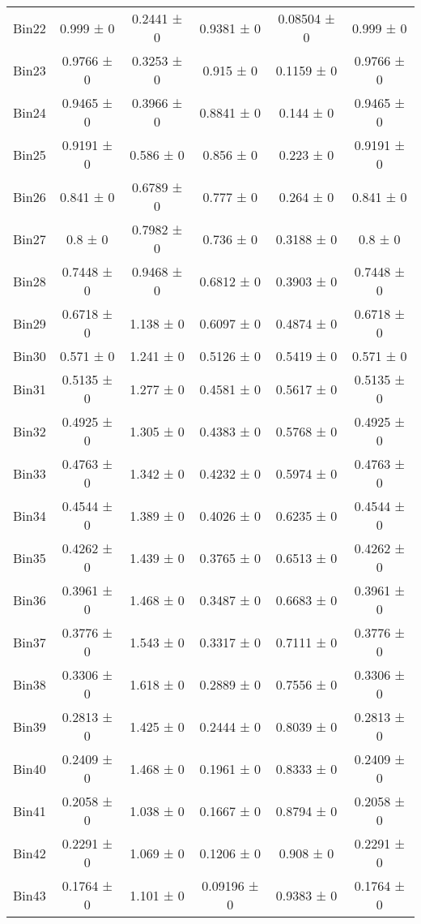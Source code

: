\begin{tabular}{@{\extracolsep{4pt}}lccccc@{}}
     Bin22 & 0.999 ± 0 & 0.2441 ± 0 & 0.9381 ± 0 & 0.08504 ± 0 & 0.999 ± 0 \\ 
     Bin23 & 0.9766 ± 0 & 0.3253 ± 0 & 0.915 ± 0 & 0.1159 ± 0 & 0.9766 ± 0 \\ 
     Bin24 & 0.9465 ± 0 & 0.3966 ± 0 & 0.8841 ± 0 & 0.144 ± 0 & 0.9465 ± 0 \\ 
     Bin25 & 0.9191 ± 0 & 0.586 ± 0 & 0.856 ± 0 & 0.223 ± 0 & 0.9191 ± 0 \\ 
     Bin26 & 0.841 ± 0 & 0.6789 ± 0 & 0.777 ± 0 & 0.264 ± 0 & 0.841 ± 0 \\ 
     Bin27 & 0.8 ± 0 & 0.7982 ± 0 & 0.736 ± 0 & 0.3188 ± 0 & 0.8 ± 0 \\ 
     Bin28 & 0.7448 ± 0 & 0.9468 ± 0 & 0.6812 ± 0 & 0.3903 ± 0 & 0.7448 ± 0 \\ 
     Bin29 & 0.6718 ± 0 & 1.138 ± 0 & 0.6097 ± 0 & 0.4874 ± 0 & 0.6718 ± 0 \\ 
     Bin30 & 0.571 ± 0 & 1.241 ± 0 & 0.5126 ± 0 & 0.5419 ± 0 & 0.571 ± 0 \\ 
     Bin31 & 0.5135 ± 0 & 1.277 ± 0 & 0.4581 ± 0 & 0.5617 ± 0 & 0.5135 ± 0 \\ 
     Bin32 & 0.4925 ± 0 & 1.305 ± 0 & 0.4383 ± 0 & 0.5768 ± 0 & 0.4925 ± 0 \\ 
     Bin33 & 0.4763 ± 0 & 1.342 ± 0 & 0.4232 ± 0 & 0.5974 ± 0 & 0.4763 ± 0 \\ 
     Bin34 & 0.4544 ± 0 & 1.389 ± 0 & 0.4026 ± 0 & 0.6235 ± 0 & 0.4544 ± 0 \\ 
     Bin35 & 0.4262 ± 0 & 1.439 ± 0 & 0.3765 ± 0 & 0.6513 ± 0 & 0.4262 ± 0 \\ 
     Bin36 & 0.3961 ± 0 & 1.468 ± 0 & 0.3487 ± 0 & 0.6683 ± 0 & 0.3961 ± 0 \\ 
     Bin37 & 0.3776 ± 0 & 1.543 ± 0 & 0.3317 ± 0 & 0.7111 ± 0 & 0.3776 ± 0 \\ 
     Bin38 & 0.3306 ± 0 & 1.618 ± 0 & 0.2889 ± 0 & 0.7556 ± 0 & 0.3306 ± 0 \\ 
     Bin39 & 0.2813 ± 0 & 1.425 ± 0 & 0.2444 ± 0 & 0.8039 ± 0 & 0.2813 ± 0 \\ 
     Bin40 & 0.2409 ± 0 & 1.468 ± 0 & 0.1961 ± 0 & 0.8333 ± 0 & 0.2409 ± 0 \\ 
     Bin41 & 0.2058 ± 0 & 1.038 ± 0 & 0.1667 ± 0 & 0.8794 ± 0 & 0.2058 ± 0 \\ 
     Bin42 & 0.2291 ± 0 & 1.069 ± 0 & 0.1206 ± 0 & 0.908 ± 0 & 0.2291 ± 0 \\ 
     Bin43 & 0.1764 ± 0 & 1.101 ± 0 & 0.09196 ± 0 & 0.9383 ± 0 & 0.1764 ± 0 \\ 

\end{tabular}
